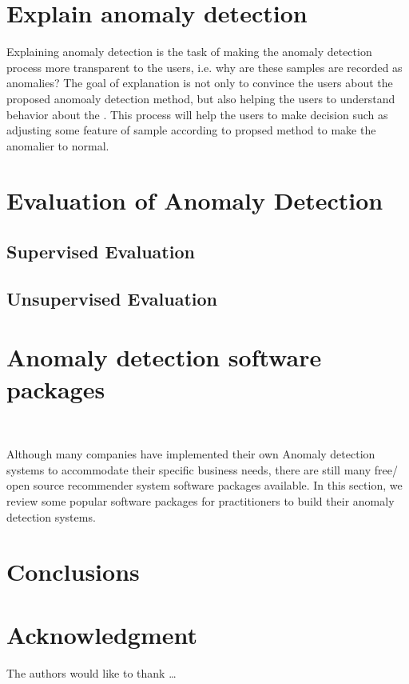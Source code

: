 \section{Explain anomaly detection}
Explaining anomaly detection is the task of making 
the anomaly detection process more transparent to the users,
i.e. why are these samples are recorded as anomalies?  
The  goal of explanation is not only to 
convince the users about the proposed anomoaly detection method,
but also helping the users to understand behavior about
the .
This process will help the users to make decision such as
adjusting some feature of sample according to propsed method to 
make the anomalier to normal.


\section{Evaluation of Anomaly Detection}

\subsection{Supervised Evaluation}

\subsection{Unsupervised Evaluation}

\section{Anomaly detection software packages}~\label{sec:tools}

Although many companies have implemented their own Anomaly detection systems 
to accommodate their specific business needs, 
there are still many free/ open source recommender system
software packages available.
In this section, 
we review some popular software packages for practitioners
to build their anomaly detection systems.

\subsection{}

\section{Conclusions} \label{sec-conclusions}

\blindtext

\section*{Acknowledgment}

\lipsum[1]


The authors would like to thank \ldots

